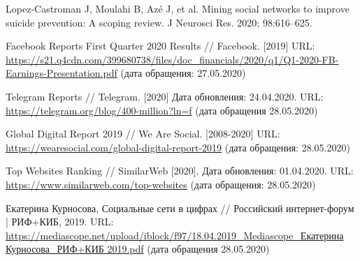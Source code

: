 \documentclass[a4paper,article,14pt]{extarticle}
\begin{document}
\begin{thebibliography}{1}
 Lopez‐Castroman J, Moulahi B, Azé J, et al. \flqq Mining social networks to improve suicide prevention: A scoping review\frqq. J Neurosci Res. 2020; 98:616–625.

 Facebook Reports First Quarter 2020 Results // Facebook. [2019] URL: \href{https://s21.q4cdn.com/399680738/files/doc\_financials/2020/q1/Q1-2020-FB-Earnings-Presentation.pdf}{https://s21.q4cdn.com/399680738/files/doc\_financials/2020/q1/Q1-2020-FB-Earnings-Presentation.pdf} (дата обращения: 27.05.2020)

 Telegram Reports // Telegram. [2020] Дата обновления: 24.04.2020. URL: \href{https://telegram.org/blog/400-million?ln=f}{https://telegram.org/blog/400-million?ln=f} (дата обращения 28.05.2020)

 Global Digital Report 2019 // We Are Social. [2008-2020] URL: \href{https://wearesocial.com/global-digital-report-2019}{https://wearesocial.com/global-digital-report-2019} (дата обращения: 28.05.2020)

 Top Websites Ranking // SimilarWeb [2020]. Дата обновления: 01.04.2020. URL: \href{https://www.similarweb.com/top-websites}{https://www.similarweb.com/top-websites} (дата обращения: 28.05.2020)

 Екатерина Курносова, Социальные сети в цифрах // Российский интернет-форум | РИФ+КИБ, 2019. URL: \href{https://mediascope.net/upload/iblock/f97/18.04.2019\_Mediascope\_\%D0\%95\%D0\%BA\%D0\%B0\%D1\%82\%D0\%B5\%D1\%80\%D0\%B8\%D0\%BD\%D0\%B0\%20\%D0\%9A\%D1\%83\%D1\%80\%D0\%BD\%D0\%BE\%D1\%81\%D0\%BE\%D0\%B2\%D0\%B0\_\%D0\%A0\%D0\%98\%D0\%A4+\%D0\%9A\%D0\%98\%D0\%91\%202019.pdf}{https://mediascope.net/upload/iblock/f97/18.04.2019\_Mediascope\_Екатерина Курносова\_РИФ+КИБ 2019.pdf} (дата обращения 28.05.2020)

\end{thebibliography}
\end{document}
